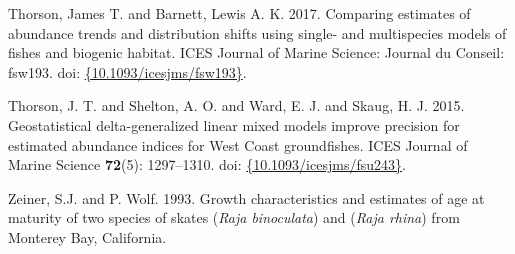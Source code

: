 \documentclass[12pt,]{article}
\begin{document}
\leavevmode\hypertarget{ref-Thorson2017a}{}%
Thorson, James T. and Barnett, Lewis A. K. 2017. Comparing estimates of
abundance trends and distribution shifts using single- and multispecies
models of fishes and biogenic habitat. ICES Journal of Marine Science:
Journal du Conseil: fsw193. doi:
\href{https://doi.org/\%7B10.1093/icesjms/fsw193\%7D}{\{10.1093/icesjms/fsw193\}}.

\leavevmode\hypertarget{ref-Thorson2015}{}%
Thorson, J. T. and Shelton, A. O. and Ward, E. J. and Skaug, H. J. 2015.
Geostatistical delta-generalized linear mixed models improve precision
for estimated abundance indices for West Coast groundfishes. ICES
Journal of Marine Science \textbf{72}(5): 1297--1310. doi:
\href{https://doi.org/\%7B10.1093/icesjms/fsu243\%7D}{\{10.1093/icesjms/fsu243\}}.

\leavevmode\hypertarget{ref-ZeinerWolf1993}{}%
Zeiner, S.J. and P. Wolf. 1993. Growth characteristics and estimates of
age at maturity of two species of skates (\emph{Raja binoculata}) and
(\emph{Raja rhina}) from Monterey Bay, California.
\end{document}
